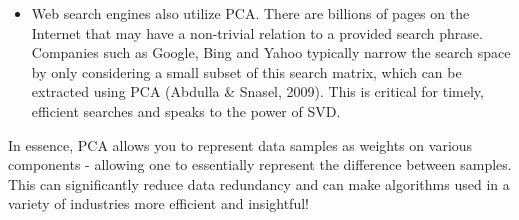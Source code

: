 \documentclass{article}
\begin{document}
\begin{itemize}
\item Web search engines also utilize PCA. There are billions of pages on the Internet that may have a non-trivial relation to a provided search phrase. Companies such as Google, Bing and Yahoo typically narrow the search space by only considering a small subset of this search matrix, which can be extracted using PCA (Abdulla \& Snasel, 2009). This is critical for timely, efficient searches and speaks to the power of SVD.
\end{itemize}

In essence, PCA allows you to represent data samples as weights on various components - allowing one to essentially represent the difference between samples. This can significantly reduce data redundancy and can make algorithms used in a variety of industries more efficient and insightful!

\small







\end{document}
